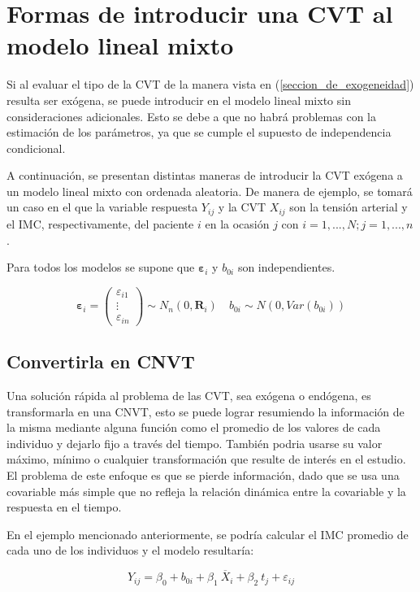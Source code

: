 \documentclass[spanish]{article}
\numberwithin{figure}{subsection}
\numberwithin{equation}{subsection}
\numberwithin{table}{subsection}
\begin{document}
\newpage

\section{Formas de introducir una CVT al modelo lineal mixto}

Si al evaluar el tipo de la CVT de la manera vista en
(\ref{seccion_de_exogeneidad}) resulta ser exógena, se puede introducir en el
modelo lineal mixto sin consideraciones adicionales. Esto se debe a que no habrá
problemas con la estimación de los parámetros, ya que se cumple el supuesto de
independencia condicional.

A continuación, se presentan distintas maneras de introducir la CVT exógena a un
modelo lineal mixto con ordenada aleatoria. De manera de ejemplo, se tomará un
caso en el que la variable respuesta $Y_{ij}$ y la CVT $X_{ij}$ son la tensión
arterial y el IMC, respectivamente, del paciente $i$ en la ocasión $j$ con
$i = 1, ..., N; j = 1, ..., n$.

Para todos los modelos se supone que $\bm{\varepsilon}_i$ y $b_{0i}$ son
independientes.

\[ 
	\bm{\varepsilon}_i = \begin{pmatrix} \varepsilon_{i1} \\ \vdots \\ \varepsilon_{in} \end{pmatrix} \sim N_{n}(0, \bm{R}_i)
	\quad
	b_{0i} \sim N(0, Var(b_{0i}))
\]

\subsection{Convertirla en CNVT}

Una solución rápida al problema de las CVT, sea exógena o endógena, es
transformarla en una CNVT, esto se puede lograr resumiendo la información de la
misma mediante alguna función como el promedio de los valores de cada individuo
y dejarlo fijo a través del tiempo. También podria usarse su valor máximo,
mínimo o cualquier transformación que resulte de interés en el estudio. El
problema de este enfoque es que se pierde información, dado que se usa una
covariable más simple que no refleja la relación dinámica entre la covariable y
la respuesta en el tiempo.

En el ejemplo mencionado anteriormente, se podría calcular el IMC promedio de
cada uno de los individuos y el modelo resultaría:

\[ Y_{ij} = \beta_0 + b_{0i} + \beta_1\ \overline{X}_i + \beta_2\ t_j + \varepsilon_{ij} \]
\end{document}
